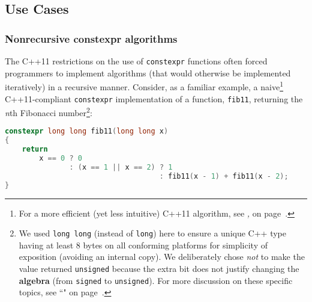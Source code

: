 \subsection[Use Cases]{Use Cases}\label{use-cases-relaxedconstexpr}

\subsubsection[Nonrecursive {\tt constexpr} algorithms]{Nonrecursive {\SubsubsecCode constexpr} algorithms}\label{non-recursive-constexpr-algorithms}

The C++11 restrictions on the use of \texttt{constexpr} functions often
forced programmers to implement algorithms (that would otherwise be
implemented iteratively) in a recursive manner. Consider, as a familiar
example, a naive{\cprotect\footnote{For a more efficient (yet less
intuitive) C++11 algorithm, see \textit{, } on page~\pageref{recursive-fibonacci}.}}
C++11-compliant \texttt{constexpr} implementation of a function,
\texttt{fib11}, returning the \emph{n}th Fibonacci number\footnote{We used \texttt{long}~\texttt{long} (instead of \texttt{long})
here to ensure a unique C++ type having at least 8 bytes on all
conforming platforms for simplicity of exposition (avoiding an internal
copy). We deliberately chose \emph{not} to make the value returned
\texttt{unsigned} because the extra bit does not justify changing the
\textbf{algebra} (from \texttt{signed} to \texttt{unsigned}). For more
discussion on these specific topics, see ``" on page~\pageref{long-long}.}:
  
\begin{lstlisting}[language=C++]
constexpr long long fib11(long long x)
{
    return
        x == 0 ? 0
               : (x == 1 || x == 2) ? 1
                                    : fib11(x - 1) + fib11(x - 2);
}
\end{lstlisting}
    
